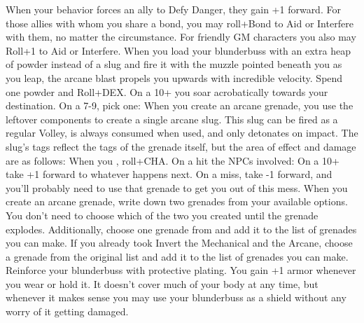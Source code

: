 \documentclass[darkmode]{dw_playbook}
\begin{document}
\pageThree
    {
        \advancedMovesCont
    }
    {
            {
            When your behavior forces an ally to Defy Danger, they gain +1 forward.  For those allies with whom you share a bond, you may roll+Bond to Aid or Interfere with them, no matter the circumstance.  For friendly GM characters you also may Roll+1 to Aid or Interfere.}
        \gap
            {
            When you load your blunderbuss with an extra heap of powder instead of a slug and fire it with the muzzle pointed beneath you as you leap, the arcane blast propels you upwards with incredible velocity.  Spend one powder and Roll+DEX.  On a 10+ you soar acrobatically towards your destination.  On a 7-9, pick one:
            \gapSm
            \gapSm
            }
        \gap
            {When you create an arcane grenade, you use the leftover components to create a single arcane slug.  This slug can be fired as a regular Volley, is always consumed when used, and only detonates on impact.  The slug’s tags reflect the tags of the grenade itself, but the area of effect and damage are as follows:
            \gapSm
            \gapSm
            \gapSm
            \gapSm
            \gapSm
            \gapSm
            }
            {When you , roll+CHA.  On a hit the NPCs involved:
            \gapSm
            \gapSm
            \gapSm
            \gap
            On a 10+ take +1 forward to whatever happens next.  On a miss, take -1 forward, and you’ll probably need to use that grenade to get you out of this mess.}
        \gap
            {When you create an arcane grenade, write down two grenades from your available options.  You don’t need to choose which of the two you created until the grenade explodes.
            \gap
            Additionally, choose one grenade from  and add it to the list of grenades you can make.  If you already took Invert the Mechanical and the Arcane, choose a grenade from the original list and add it to the list of grenades you can make.}
        \gap
            {
            Reinforce your blunderbuss with protective plating.  You gain +1 armor whenever you wear or hold it.  It doesn’t cover much of your body at any time, but whenever it makes sense you may use your blunderbuss as a shield without any worry of it getting damaged.}
    }
\end{document}
